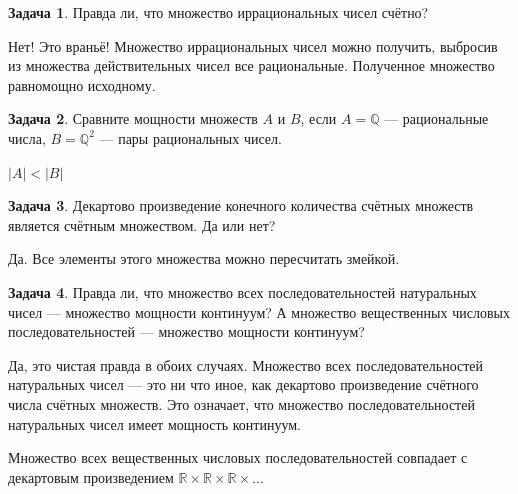 \documentclass[pdftex, 12pt, a4paper]{article}
\def \mbb{\mathbb}
\def \RR{\mbb R}
\def \QQ{\mbb Q}
\theoremstyle{definition} %
\newtheorem{problem}{Задача}
\numberwithin{problem}{section}
\numberwithin{blits}{section}
\begin{document}
\begin{problem} Правда ли, что множество иррациональных чисел счётно?
\begin{sol}
Нет! Это враньё! Множество иррациональных чисел можно получить, выбросив из множества действительных чисел все рациональные. Полученное множество равномощно исходному.
\end{sol}
\end{problem}


\begin{problem}
Сравните мощности множеств $A$ и $B$, если $A = \QQ$ --- рациональные числа, $B = \QQ^{2}$ --- пары рациональных чисел.
\begin{sol}
$|A| <|B|$
\end{sol}
\end{problem}





\begin{problem}
Декартово произведение конечного количества счётных множеств
является счётным множеством. Да или нет?
\begin{sol}
Да. Все элементы этого множества можно пересчитать змейкой.
\end{sol}
\end{problem}



\begin{problem}\label{uprposled}
Правда ли, что множество всех последовательностей натуральных чисел --- множество мощности континуум? А множество вещественных числовых последовательностей --- множество мощности континуум?
\begin{sol}

Да, это чистая правда в обоих случаях. Множество всех последовательностей натуральных чисел --- это ни что иное, как декартово произведение счётного числа счётных множеств. Это означает, что множество последовательностей натуральных чисел имеет мощность континуум.

Множество всех вещественных числовых последовательностей совпадает с декартовым произведением $\RR \times \RR \times \RR \times \ldots$
\end{sol}
\end{problem}
\end{document}
